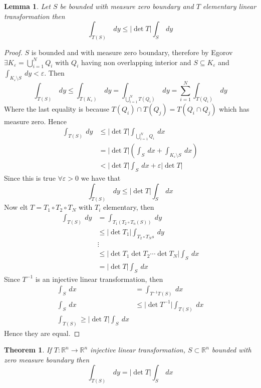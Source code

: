\documentclass[11pt,openany]{book}
\theoremstyle{plain}
\newtheorem{theorem}{Theorem}[chapter]
\newtheorem{lemma}{Lemma}[chapter]
\theoremstyle{definition}
\theoremstyle{remark}
\newcommand{\R}{\mathbb{R}}
\newcommand{\abs}[1]{\lvert #1 \rvert}
\begin{document}
\begin{lemma}
    Let $S$ be bounded with measure zero boundary and $T$ elementary linear transformation then 
    $$\int_{T(S)} \ dy \le \abs{\det T} \int_{S} \ dy$$
\end{lemma}

\begin{proof}
    $S$ is bounded and with measure zero boundary, therefore by Egorov $\exists K_\varepsilon = \bigcup_{i=1}^N Q_i$ with $Q_i$ having non 
    overlapping interior and $S \subseteq K_\varepsilon$ and $\int_{K_\varepsilon \setminus S} \ dy < \varepsilon$. Then 
    $$\int_{T(S)} \ dy \le \int_{T(K_\varepsilon)} \ dy = \int_{\bigcup_{i=1}^N T(Q_i)} \ dy = \sum_{i=1}^N \int_{T(Q_i)} \ dy$$
    Where the last equality is because $T(Q_i) \cap T(Q_j) = T(Q_i \cap Q_j)$  which has measure zero. Hence 
    \begin{align*}
        \int_{T(S)} \ dy &\le \abs{\det T} \int_{\bigcup_{i=1}^N Q_i} \ dx \\
        &= \abs{\det T} (\int_S \ dx + \int_{K_\varepsilon \setminus S} \ dx) \\
        &< \abs{\det T} \int_S \ dx + \varepsilon \abs{\det T}
    \end{align*}
    Since this is true $\forall \varepsilon > 0$ we have that 
    $$\int_{T(S)} \ dy \le \abs{\det T} \int_S \ dx$$
    Now elt $T = T_1 \circ T_2 \circ T_N$ with $T_i$ elementary, then 
    \begin{align*}
        \int_{T(S)} \ dy &= \int_{T_1 (T_2 \circ T_n (S))} \ dy \\
        &\le \abs{\det T_1} \int_{T_2 \circ T_N s} \ dy \\
        &\vdots \\
        &\le \abs{\det T_1 \det T_2 \cdots \det T_N} \int_S \ dx \\
        &= \abs{\det T} \int_S \ dx
    \end{align*}
    Since $T^{-1}$ is an injective linear transformation, then 
    \begin{align*}
        \int_S \ dx &= \int_{T^{-1} T(S)} \ dx \\
        \int_S \ dx &\le \abs{\det T^{-1}} \int_{T(S)} \ dx \\
        \int_{T(S)} \ge \abs{\det T} \int_S \ dx 
    \end{align*}
    Hence they are equal.
\end{proof}


\begin{theorem}
    If $T \colon \R^n \to \R^n$ injective linear transformation, $S \subset \R^n$ bounded with zero measure boundary then 
    $$\int_{T(S)} \ dy = \abs{\det T} \int_S \ dx$$
\end{theorem}
\end{document}
